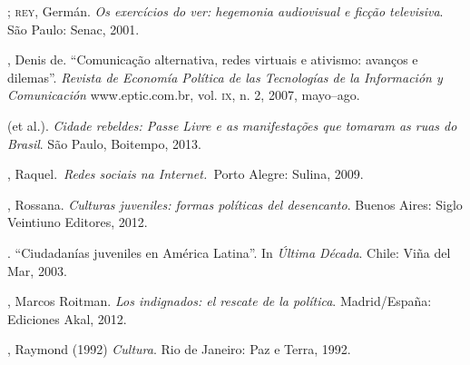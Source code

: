 \begin{bibliohedra}
\titidem; \textsc{rey}, Germán. \emph{Os exercícios do ver:
hegemonia audiovisual e ficção televisiva}. São Paulo: Senac, 2001.

, Denis de. ``Comunicação alternativa, redes virtuais e ativismo:
avanços e dilemas''. \emph{Revista de Economía Política de las
Tecnologías de la Información y Comunicación} www.eptic.com.br, vol. \textsc{ix},
n. 2, 2007, mayo--ago.

 (et al.). \emph{Cidade rebeldes: Passe Livre e as
manifestações que tomaram as ruas do Brasil}. São Paulo, Boitempo, 2013.

, Raquel.~\emph{Redes sociais na Internet.~}Porto Alegre: Sulina,
2009.

, Rossana. \emph{Culturas juveniles: formas políticas del
desencanto}. Buenos Aires: Siglo Veintiuno Editores, 2012.

\titidem. ``Ciudadanías juveniles en América
Latina''. In \emph{Última Década}. Chile: Viña del Mar, 2003.

, Marcos Roitman. \emph{Los indignados: el rescate de la
política}. Madrid/España: Ediciones Akal, 2012.

, Raymond (1992) \emph{Cultura}. Rio de Janeiro: Paz e Terra,
1992.
\end{bibliohedra}




